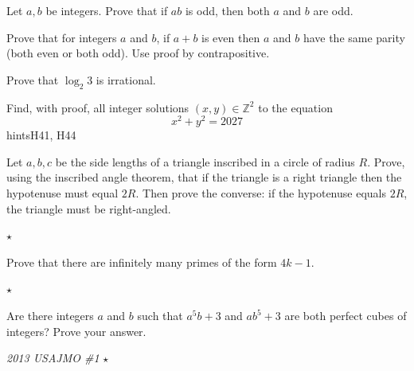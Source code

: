\begin{problem}
Let $a, b$ be integers. Prove that if $ab$ is odd, then both $a$ and $b$ are odd. 
\end{problem}

\begin{problem}
Prove that for integers $a$ and $b$, if $a + b$ is even then $a$ and $b$ have the same parity (both even or both odd). Use proof by contrapositive.
\end{problem}

\begin{problem}
Prove that $\log_2 3$ is irrational. 
\end{problem}

\begin{problem}
Find, with proof, all integer solutions $(x, y) \in \mathbb{Z}^2$ to the equation
\[
x^2 + y^2 = 2027
\]
hints{H41, H44}
\end{problem}

\begin{problem}
Let $a, b, c$ be the side lengths of a triangle inscribed in a circle of radius $R$. Prove, using the inscribed angle theorem, that if the triangle is a right triangle then the hypotenuse must equal $2R$. Then prove the converse: if the hypotenuse equals $2R$, the triangle must be right-angled.

 \hfill $\star$
\end{problem}

\begin{problem}
Prove that there are infinitely many primes of the form $4k - 1$. 

\hfill $\star$
\end{problem}

\begin{problem}
Are there integers $a$ and $b$ such that $a^5b + 3$ and $ab^5 + 3$ are both perfect cubes of integers? Prove your answer. 

\hfill \textit{2013 USAJMO \#1} $\star$
\end{problem}